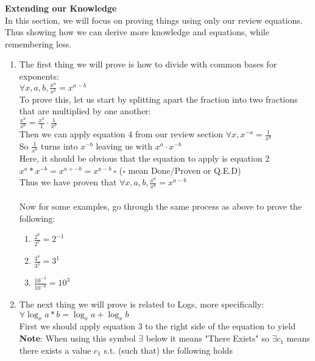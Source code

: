 \documentclass[11pt]{article}
\begin{document}
\pagebreak
\textbf{Extending our Knowledge} \\
In this section, we will focus on proving things using only our review equations. Thus showing how we can derive more knowledge and equations, while remembering less.
\begin{enumerate}
    \item The first thing we will prove is how to divide with common bases for exponents: \\
        $\forall x, a, b, \frac{x^a}{x^b} = x^{a-b}$ \\
        To prove this, let us start by splitting apart the fraction into two fractions that are multiplied by one another: \\
        $\frac{x^a}{x^b} = \frac{x^a}{1} \cdot \frac{1}{x^b}$ \\
        Then we can apply equation 4 from our review section $\forall x, x^{-a} = \frac{1}{x^a}$ \\
        So $\frac{1}{x^b}$ turns into $x^{-b}$ leaving us with $x^{a} \cdot x^{-b}$ \\
        Here, it should be obvious that the equation to apply is equation 2 \\ 
        $x^{a} * x^{-b} = x^{a+-b} = x^{a-b} \ \square$ ($\square$ mean Done/Proven or Q.E.D) \\
        Thus we have proven that $\forall x, a, b, \frac{x^a}{x^b} = x^{a-b}$ \\ \\
        Now for some examples, go through the same process as above to prove the following:
        \begin{enumerate}
            \item $\frac{2^6}{2^7} = 2^{-1}$
            \item $\frac{3^4}{3^3} = 3^{1}$
            \item $\frac{10^{-3}}{10^{-6}} = 10^3$
        \end{enumerate}
    \item The next thing we will prove is related to Logs, more specifically: \\
        $\forall \log_{x}{a*b} = \log_{x}{a} + \log_{x}{b}$ \\
        First we should apply equation 3 to the right side of the equation to yield \\
        \textbf{Note}: When using this symbol $\exists$ below it means "There Exists" so $\exists c_1$ means there exists a value $c_1$ s.t. (such that) the following holds \\

\end{enumerate}
\end{document}
